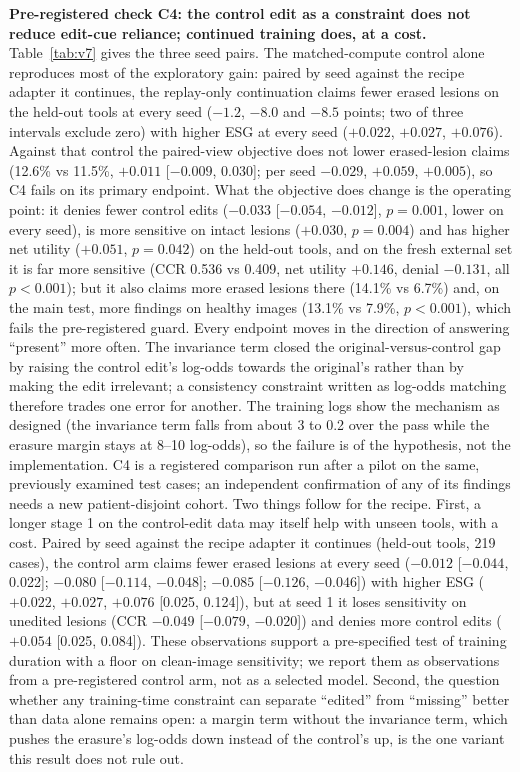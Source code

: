 \documentclass[11pt]{article}
\begin{document}
\textbf{Pre-registered check C4: the control edit as a constraint does not reduce edit-cue reliance; continued training does, at a cost.} Table~\ref{tab:v7} gives the three seed pairs. The matched-compute control alone reproduces most of the exploratory gain: paired by seed against the recipe adapter it continues, the replay-only continuation claims fewer erased lesions on the held-out tools at every seed ($-1.2$, $-8.0$ and $-8.5$ points; two of three intervals exclude zero) with higher ESG at every seed ($+0.022$, $+0.027$, $+0.076$). Against that control the paired-view objective does not lower erased-lesion claims (12.6\% vs 11.5\%, $+0.011$ [$-0.009$, 0.030]; per seed $-0.029$, $+0.059$, $+0.005$), so C4 fails on its primary endpoint. What the objective does change is the operating point: it denies fewer control edits ($-0.033$ [$-0.054$, $-0.012$], $p=0.001$, lower on every seed), is more sensitive on intact lesions ($+0.030$, $p=0.004$) and has higher net utility ($+0.051$, $p=0.042$) on the held-out tools, and on the fresh external set it is far more sensitive (CCR 0.536 vs 0.409, net utility $+0.146$, denial $-0.131$, all $p<0.001$); but it also claims more erased lesions there (14.1\% vs 6.7\%) and, on the main test, more findings on healthy images (13.1\% vs 7.9\%, $p<0.001$), which fails the pre-registered guard. Every endpoint moves in the direction of answering ``present'' more often. The invariance term closed the original-versus-control gap by raising the control edit's log-odds towards the original's rather than by making the edit irrelevant; a consistency constraint written as log-odds matching therefore trades one error for another. The training logs show the mechanism as designed (the invariance term falls from about 3 to 0.2 over the pass while the erasure margin stays at 8--10 log-odds), so the failure is of the hypothesis, not the implementation. C4 is a registered comparison run after a pilot on the same, previously examined test cases; an independent confirmation of any of its findings needs a new patient-disjoint cohort. Two things follow for the recipe. First, a longer stage 1 on the control-edit data may itself help with unseen tools, with a cost. Paired by seed against the recipe adapter it continues (held-out tools, 219 cases), the control arm claims fewer erased lesions at every seed ($-0.012$ [$-0.044$, 0.022]; $-0.080$ [$-0.114$, $-0.048$]; $-0.085$ [$-0.126$, $-0.046$]) with higher ESG ($+0.022$, $+0.027$, $+0.076$ [0.025, 0.124]), but at seed 1 it loses sensitivity on unedited lesions (CCR $-0.049$ [$-0.079$, $-0.020$]) and denies more control edits ($+0.054$ [0.025, 0.084]). These observations support a pre-specified test of training duration with a floor on clean-image sensitivity; we report them as observations from a pre-registered control arm, not as a selected model. Second, the question whether any training-time constraint can separate ``edited'' from ``missing'' better than data alone remains open: a margin term without the invariance term, which pushes the erasure's log-odds down instead of the control's up, is the one variant this result does not rule out.
\end{document}

